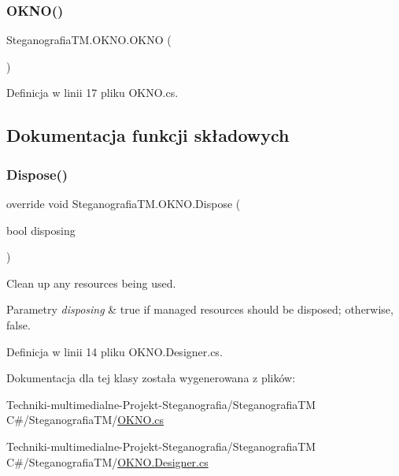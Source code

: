 \subsubsection{\texorpdfstring{O\+K\+N\+O()}{OKNO()}}
{\footnotesize\ttfamily Steganografia\+T\+M.\+O\+K\+N\+O.\+O\+K\+NO (\begin{DoxyParamCaption}{ }\end{DoxyParamCaption})}



Definicja w linii 17 pliku O\+K\+N\+O.\+cs.



\subsection{Dokumentacja funkcji składowych}
\mbox{\label{class_steganografia_t_m_1_1_o_k_n_o_aab165c92013c9cd58f51cf2ae5be4531}} 
\subsubsection{\texorpdfstring{Dispose()}{Dispose()}}
{\footnotesize\ttfamily override void Steganografia\+T\+M.\+O\+K\+N\+O.\+Dispose (\begin{DoxyParamCaption}\item[{bool}]{disposing }\end{DoxyParamCaption})\hspace{0.3cm}{\ttfamily [protected]}}



Clean up any resources being used. 


\begin{DoxyParams}{Parametry}
{\em disposing} & true if managed resources should be disposed; otherwise, false.\\
\hline
\end{DoxyParams}


Definicja w linii 14 pliku O\+K\+N\+O.\+Designer.\+cs.



Dokumentacja dla tej klasy została wygenerowana z plików\+:\begin{DoxyCompactItemize}
\item 
Techniki-\/multimedialne-\/\+Projekt-\/\+Steganografia/\+Steganografia\+T\+M C\#/\+Steganografia\+T\+M/\hyperlink{_o_k_n_o_8cs}{O\+K\+N\+O.\+cs}\item 
Techniki-\/multimedialne-\/\+Projekt-\/\+Steganografia/\+Steganografia\+T\+M C\#/\+Steganografia\+T\+M/\hyperlink{_o_k_n_o_8_designer_8cs}{O\+K\+N\+O.\+Designer.\+cs}\end{DoxyCompactItemize}
